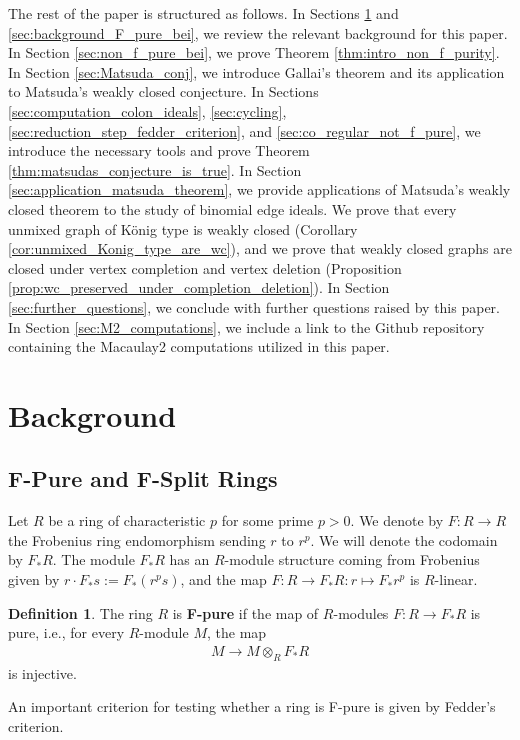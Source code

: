 \documentclass[12pt,a4paper]{amsart}
\theoremstyle{plain}
\theoremstyle{definition}
\newtheorem{defn}[thrm]{Definition}
\def\bdefn{\begin{defn}}
\def\edefn{\end{defn}}
\theoremstyle{remark}
\let\ra=\rightarrow
\let\bra=\mapsto
\let\tensor=\otimes
\begin{document}
The rest of the paper is structured as follows.  In Sections \ref{sec:background} and \ref{sec:background_F_pure_bei}, we review the relevant background for this paper. In Section \ref{sec:non_f_pure_bei}, we prove Theorem \ref{thm:intro_non_f_purity}. In Section \ref{sec:Matsuda_conj}, we introduce Gallai's theorem and its application to Matsuda's weakly closed conjecture. In Sections \ref{sec:computation_colon_ideals}, \ref{sec:cycling}, \ref{sec:reduction_step_fedder_criterion}, and \ref{sec:co_regular_not_f_pure}, we introduce the necessary tools and prove Theorem \ref{thm:matsudas_conjecture_is_true}. In Section \ref{sec:application_matsuda_theorem}, we provide applications of Matsuda's weakly closed theorem to the study of binomial edge ideals. We prove that every unmixed graph of K\"onig type is weakly closed (Corollary \ref{cor:unmixed_Konig_type_are_wc}), and we prove that weakly closed graphs are closed under vertex completion and vertex deletion (Proposition \ref{prop:wc_preserved_under_completion_deletion}). In Section \ref{sec:further_questions}, we conclude with further questions raised by this paper. In Section \ref{sec:M2_computations}, we include a link to the Github repository containing the Macaulay2 computations utilized in this paper.

\section{Background}
\label{sec:background}

\subsection{F-Pure and F-Split Rings}

Let $R$ be a ring of characteristic $p$ for some prime $p > 0$. We denote by $F : R \ra R$ the Frobenius ring endomorphism sending $r$ to $r^{p}$. We will denote the codomain by $F_{\ast}R$. The module $F_{\ast}R$ has an $R$-module structure coming from Frobenius given by $r \cdot F_{\ast} s := F_{\ast} (r^{p}s)$, and the map $F : R \ra F_{\ast}R : r \bra F_{\ast} r^{p}$ is $R$-linear. 

\bdefn
\label{defn:F_pure}
The ring $R$ is \textbf{F-pure} if the map of $R$-modules $F : R \ra F_{\ast}R$ is pure, i.e., for every $R$-module $M$, the map
\begin{align*}
    M \ra M \tensor_{R} F_{\ast} R
\end{align*}
is injective.
\edefn 

An important criterion for testing whether a ring is F-pure is given by Fedder's criterion. 
\end{document}
